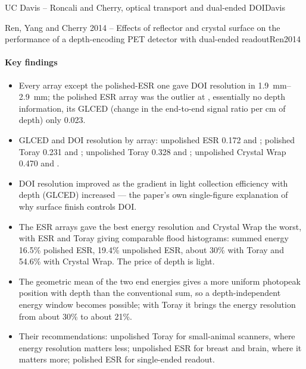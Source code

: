 \begin{programnote}{UC Davis -- Roncali and Cherry, optical transport and dual-ended DOI}{Davis}
\begin{papernote}{Ren, Yang and Cherry 2014 -- Effects of reflector and crystal surface on the performance of a depth-encoding PET detector with dual-ended readout}{Ren2014}
\paragraph{Key findings}
\begin{itemize}
	\item Every array except the polished-ESR one gave DOI resolution in
		\qtyrange{1.9}{2.9}{\milli\metre}; the polished ESR array was the
		outlier at , essentially no depth information, its GLCED
		(change in the end-to-end signal ratio per cm of depth) only 0.023.
	\item GLCED and DOI resolution by array: unpolished ESR 0.172 and
		; polished Toray 0.231 and ; unpolished Toray 0.328
		and ; unpolished Crystal Wrap 0.470 and .
	\item DOI resolution improved as the gradient in light collection
		efficiency with depth (GLCED) increased --- the paper's own
		single-figure explanation of why surface finish controls DOI.
	\item The ESR arrays gave the best energy resolution and Crystal Wrap the
		worst, with ESR and Toray giving comparable flood histograms: summed
		energy 16.5\% polished ESR, 19.4\% unpolished ESR, about 30\% with
		Toray and 54.6\% with Crystal Wrap. The price of depth is light.
	\item The geometric mean of the two end energies gives a more uniform
		photopeak position with depth than the conventional sum, so a
		depth-independent energy window becomes possible; with Toray it
		brings the energy resolution from about 30\% to about 21\%.
	\item Their recommendations: unpolished Toray for small-animal scanners,
		where energy resolution matters less; unpolished ESR for breast and
		brain, where it matters more; polished ESR for single-ended readout.
\end{itemize}


\end{papernote}
\end{programnote}
